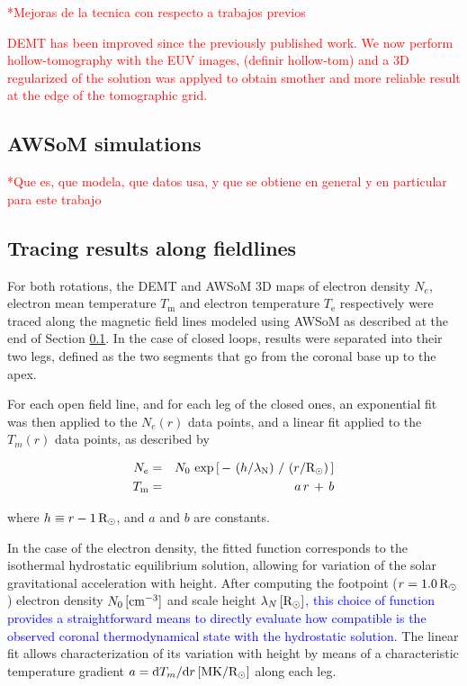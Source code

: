 \documentclass[namedreferences]{solarphysics}
\renewcommand{\l}{\lambda_{\rm N}}%
\newcommand{\mrsun}{{\rm R_\odot}}
\newcommand{\MK}{{\rm MK}}
\newcommand{\cm}{{\rm cm}}
\newcommand{\lN}{\lambda_N}
\begin{document}
\begin{article}
\textcolor{red}{*Mejoras de la tecnica con respecto a trabajos previos}

\textcolor{red}{DEMT has been improved since the previously published work. We now perform hollow-tomography with the EUV images, (definir hollow-tom) and a 3D regularized of the solution was applyed to obtain smother and more reliable result at the edge of the tomographic grid.}

\subsection{AWSoM simulations}\label{awsom} 
\textcolor{red}{*Que es, que modela, que datos usa, y que se obtiene en general y en particular para este trabajo}


\subsection{Tracing results along fieldlines}\label{trace} 



For both rotations, the DEMT and AWSoM 3D maps of electron density $N_e$, electron mean temperature $T_\textrm{m}$ and electron temperature $T_\textrm{e}$ respectively were traced along the magnetic field lines modeled using AWSoM as described at the end of Section \ref{awsom}. In the case of closed loops, results were separated into their two legs, defined as the two segments that go from the coronal base up to the apex.

For each open field line, and for each leg of the closed ones, an exponential fit was then applied to the $N_e(r)$ data points, and a linear fit applied to the $T_m(r)$ data points, as described by

\begin{eqnarray}\label{Nfit}
N_e &=& N_0\,\exp{\left[\,-\,\left(h/\l\right)\,/\,\left(r/\mrsun\right)\,\right]}\\
\label{Tfit}
T_\textrm{m} &=& a\,r\,+\,b
\end{eqnarray}
 
\noindent
where $h \equiv r - 1\,\mrsun$, and $a$ and $b$ are constants. 

In the case of the electron density, the fitted function corresponds to the isothermal hydrostatic equilibrium solution, allowing for variation of the solar gravitational acceleration with height. After computing the footpoint ($r=1.0\,\mrsun$) electron density $N_{0}\,[\cm^{-3}]$ and scale height $\lN\,[\mrsun]$\textcolor{blue}{, this choice of function provides a straightforward means to directly evaluate how compatible is the observed coronal thermodynamical state with the hydrostatic solution}. The linear fit allows characterization of its variation with height by means of a characteristic temperature gradient $a = \textrm{d}T_m/\textrm{d}r\,[\MK/\mrsun]$ along each leg.





\end{article}
\end{document}
